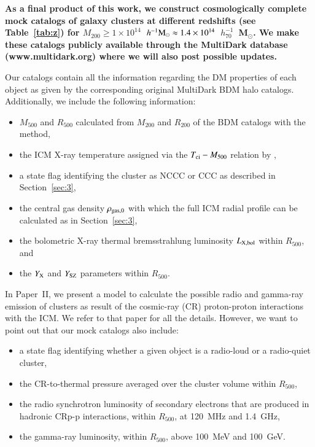 \documentclass[useAMS,usenatbib]{mn2e}
\begin{document}
{\bf As a final product of this work, we construct cosmologically complete mock
  catalogs of galaxy clusters at different redshifts (see Table~\ref{tab:z}) for
  $M_{200}\geq1\times10^{14}$~$h^{-1}{\mathrm{M}}_{\odot}
  \approx1.4\times10^{14}$~$h_{70}^{-1}$~M$_{\odot}$.  We make these catalogs
  publicly available through the MultiDark database (www.multidark.org) where we
  will also post possible updates.

  Our catalogs contain all the information regarding the DM properties of each
  object as given by the corresponding original MultiDark BDM halo
  catalogs. Additionally, we include the following information:

\begin{itemize}
\item $M_{500}$ and $R_{500}$ calculated from $M_{200}$ and $R_{200}$ of the BDM catalogs with the \cite{2003ApJ...584..702H} method,
\item the ICM X-ray temperature assigned via the $T_{{\mathrm{ci}}}-M_{500}$ relation by \cite{2010MNRAS.406.1773M},
\item a state flag identifying the cluster as NCCC or CCC as described in Section~\ref{sec:3},
\item the central gas density $\rho_{{\mathrm{gas}},0}$ with which the full ICM radial profile can be calculated as in Section~\ref{sec:3},
\item the bolometric X-ray thermal bremsstrahlung luminosity $L_{{\mathrm{X, bol}}}$
  within $R_{500}$, and
\item the $Y_{{\mathrm{X}}}$ and $Y_{{\mathrm{SZ}}}$ parameters within $R_{500}$.
\end{itemize}

In Paper~II, we present a model to calculate the possible radio and gamma-ray
emission of clusters as result of the cosmic-ray (CR) proton-proton interactions
with the ICM. We refer to that paper for all the details. However, we want to
point out that our mock catalogs also include:

\begin{itemize}
\item a state flag identifying whether a given object is a radio-loud or a radio-quiet cluster, 
\item the CR-to-thermal pressure averaged over the cluster volume within $R_{500}$,
\item the radio synchrotron luminosity of secondary electrons that are produced
  in hadronic CRp-p interactions, within $R_{500}$, at 120~MHz and 1.4~GHz,
\item the gamma-ray luminosity, within $R_{500}$, above 100~MeV and 100~GeV.
\end{itemize}

}
\end{document}
